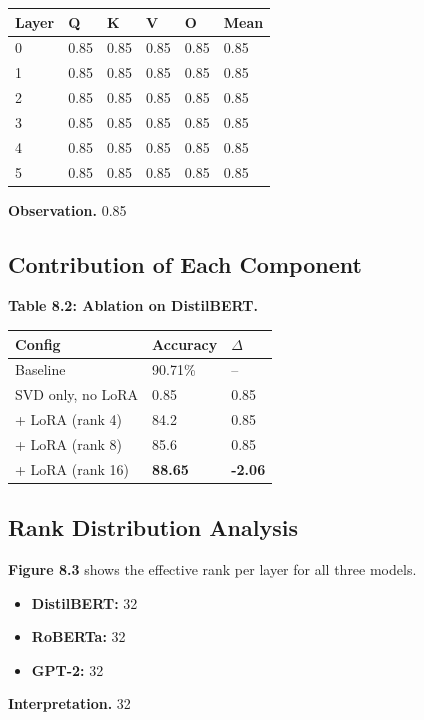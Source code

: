 \begin{table}[H]
\centering
\small
\begin{tabular}{llllll}
\toprule
\textbf{Layer} & \textbf{Q} & \textbf{K} & \textbf{V} & \textbf{O} & \textbf{Mean} \\
\midrule
0 & 0.85 & 0.85 & 0.85 & 0.85 & 0.85 \\
1 & 0.85 & 0.85 & 0.85 & 0.85 & 0.85 \\
2 & 0.85 & 0.85 & 0.85 & 0.85 & 0.85 \\
3 & 0.85 & 0.85 & 0.85 & 0.85 & 0.85 \\
4 & 0.85 & 0.85 & 0.85 & 0.85 & 0.85 \\
5 & 0.85 & 0.85 & 0.85 & 0.85 & 0.85 \\
\bottomrule
\end{tabular}
\end{table}

\textbf{Observation.} 0.85

\subsection{Contribution of Each Component}

\textbf{Table 8.2: Ablation on DistilBERT.}

\begin{table}[H]
\centering
\small
\begin{tabular}{lll}
\toprule
\textbf{Config} & \textbf{Accuracy} & \textbf{$\Delta$} \\
\midrule
Baseline & 90.71\% & -- \\
SVD only, no LoRA & 0.85 & 0.85 \\
+ LoRA (rank 4) & 84.2 & 0.85 \\
+ LoRA (rank 8) & 85.6 & 0.85 \\
+ LoRA (rank 16) & \textbf{88.65} & \textbf{-2.06} \\
\bottomrule
\end{tabular}
\end{table}

\subsection{Rank Distribution Analysis}

\textbf{Figure 8.3} shows the effective rank per layer for all three models.

\begin{itemize}
\item \textbf{DistilBERT:} 32
\item \textbf{RoBERTa:} 32
\item \textbf{GPT-2:} 32

\end{itemize}
\textbf{Interpretation.} 32

